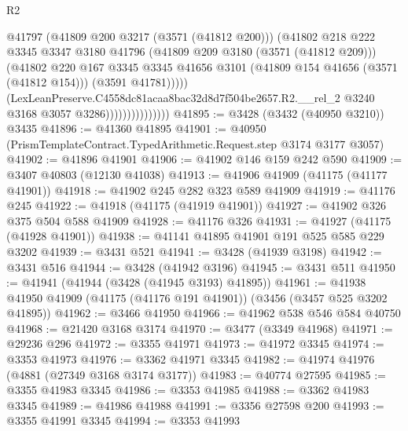 \begin{lexlean}{R2}
\begin{coremodule}
                                    @41797
                                    (@41809 @200 @3217 (@3571 (@41812 @200)))
                                    (@41802
                                      @218
                                      @222
                                      @3345
                                      @3347
                                      @3180
                                      @41796
                                      (@41809 @209 @3180 (@3571 (@41812 @209)))
                                      (@41802
                                        @220
                                        @167
                                        @3345
                                        @3345
                                        @41656
                                        @3101
                                        (@41809 @154 @41656 (@3571 (@41812 @154)))
                                        (@3591 @41781)))))
                                (LexLeanPreserve.C4558dc81acaa8bac32d8d7f504be2657.R2.__rel_2
                                  @3240
                                  @3168
                                  @3057
                                  @3286)))))))))))))))
@41895 := @3428 (@3432 (@40950 @3210)) @3435
@41896 := @41360 @41895
@41901 := @40950 (PrismTemplateContract.TypedArithmetic.Request.step @3174 @3177 @3057)
@41902 := @41896 @41901
@41906 := @41902 @146 @159 @242 @590
@41909 := @3407 @40803 (@12130 @41038)
@41913 := @41906 @41909 (@41175 (@41177 @41901))
@41918 := @41902 @245 @282 @323 @589 @41909
@41919 := @41176 @245
@41922 := @41918 (@41175 (@41919 @41901))
@41927 := @41902 @326 @375 @504 @588 @41909
@41928 := @41176 @326
@41931 := @41927 (@41175 (@41928 @41901))
@41938 := @41141 @41895 @41901 @191 @525 @585 @229 @3202
@41939 := @3431 @521
@41941 := @3428 (@41939 @3198)
@41942 := @3431 @516
@41944 := @3428 (@41942 @3196)
@41945 := @3431 @511
@41950 := @41941 (@41944 (@3428 (@41945 @3193) @41895))
@41961 := @41938 @41950 @41909 (@41175 (@41176 @191 @41901)) (@3456 (@3457 @525 @3202 @41895))
@41962 := @3466 @41950
@41966 := @41962 @538 @546 @584 @40750
@41968 := @21420 @3168 @3174
@41970 := @3477 (@3349 @41968)
@41971 := @29236 @296
@41972 := @3355 @41971
@41973 := @41972 @3345
@41974 := @3353 @41973
@41976 := @3362 @41971 @3345
@41982 := @41974 @41976 (@4881 (@27349 @3168 @3174 @3177))
@41983 := @40774 @27595
@41985 := @3355 @41983 @3345
@41986 := @3353 @41985
@41988 := @3362 @41983 @3345
@41989 := @41986 @41988
@41991 := @3356 @27598 @200
@41993 := @3355 @41991 @3345
@41994 := @3353 @41993

\end{coremodule}
\end{lexlean}
